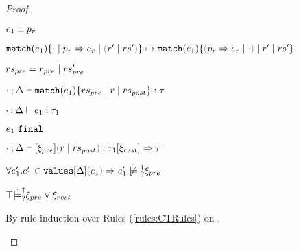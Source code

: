 \begin{proof}
\begin{byCases}
\begin{byCases}
\begin{byCases}
\begin{byCases}
      \item[\text{Scrutinee doesn't matche pattern}]
        \begin{pfsteps*}
        \item $e_1 \mathbin{\bot} p_r$  
        \item $\hlongtrans{\hmatch{e_1}{\zruls{\cdot}{\hrul{p_r}{e_r}}{\hrulesP{r'}{rs'}}}}{\hmatch{e_1}{\zruls{\hrulesP{\hrul{p_r}{e_r}}{\cdot}}{r'}{rs'}}}$ 
        \end{pfsteps*}
      \end{byCases}
    \end{byCases}
  \end{byCases}
    
\resetpfcounter
\item[\text{(\ref{rule:TMatchNZPre})}]
  \begin{pfsteps*}
  \item $rs_{pre} = r_{pre} \mid rs_{pre}'$ 
  \item $\cdot \mathbin{;} \Delta \vdash \mathtt{match}(e_1) \{rs_{pre} \mid r \mid rs_{post}\} : \tau$  
  \item $\cdot \mathbin{;} \Delta \vdash e_1 : \tau_1$  
  \item $e_1 ~\mathtt{final}$  
  \item $\chrulstyp{\cdot}{\Delta}{\xi_{pre}}{\hrulesP{r}{rs_{post}}}{\tau_1}{\xi_{rest}}{\tau}$  
  \item $\forall e_1'. \inValues{e_1'}{\Delta}{e_1} \Rightarrow \cnotsatisfyormay{e_1'}{\xi_{pre}}$  
  \item $\top \dot{\models}_{?}^{\dag} \xi_{pre} \vee \xi_{rest}$  
  \end{pfsteps*}
  By rule induction over Rules (\ref{rules:CTRules}) on .
  \begin{byCases}


\end{byCases}
\end{byCases}
\end{proof}
